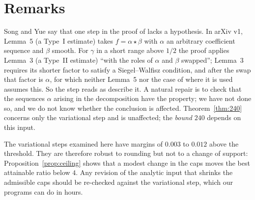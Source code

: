 \section{Remarks}

\begin{remark}\label{rem:lemma5}
Song and Yue \cite[Remark~4.23]{SY26} say that one step in the proof of
\cite[Lemma~5]{Sta26} lacks a hypothesis. In arXiv v1, Lemma~5 (a Type~I
estimate) takes $f=\alpha\star\beta$ with $\alpha$ an arbitrary
coefficient sequence and $\beta$ smooth. For $\gamma$ in a short range above
$1/2$ the proof applies Lemma~3 (a Type~II estimate) ``with the roles of
$\alpha$ and $\beta$ swapped''; Lemma~3 requires its shorter factor to satisfy
a Siegel--Walfisz condition, and after the swap that factor is $\alpha$, for
which neither Lemma~5 nor the case of \cite[Definition~9]{Sta26} where it is
used assumes this. So the step reads as \cite{SY26} describe it. A natural
repair is to check that the sequences $\alpha$ arising in the decomposition
have the property; we have not done so, and we do not know whether the
conclusion is affected. Theorem~\ref{thm:240} concerns only the variational
step and is unaffected; the \emph{bound} $240$ depends on this input.
\end{remark}

\begin{remark}
The variational steps examined here have margins of $0.003$ to $0.012$ above
the threshold. They are therefore robust to rounding but not to a change of
support: Proposition~\ref{prop:ceiling} shows that a modest change in the caps
moves the best attainable ratio below $4$. Any revision of the analytic input
that shrinks the admissible caps should be re-checked against the variational
step, which our programs can do in hours.
\end{remark}

